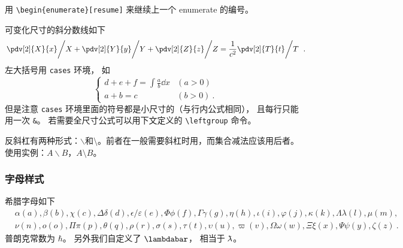 用 \verb|\begin{enumerate}[resume]|  来继续上一个 enumerate 的编号。

可变化尺寸的斜分数线如下
\begin{equation}
\left. \pdv[2]{X}{x} \middle/ X + \pdv[2]{Y}{y} \middle/ Y + \pdv[2]{Z}{z} \middle/ Z  = \frac{1}{c^2}  \pdv[2]{T}{t} \middle/ T\right.~.
\end{equation}
左大括号用 \verb|cases| 环境， 如
\begin{equation}
\begin{cases}
d+e+f = \int \frac{a}{b} \dd{x} &(a > 0)\\
a+b = c &(b > 0)~.
\end{cases}
\end{equation}
但是注意 \verb|cases| 环境里面的符号都是小尺寸的（与行内公式相同）， 且每行只能用一次 \verb|&|。 若需要全尺寸公式可以用下文定义的 \verb|\leftgroup| 命令。

反斜杠有两种形式：$\backslash$和$\setminus$。前者在一般需要斜杠时用，而集合减法应该用后者。使用实例：$A\backslash B$，$A\setminus B$。

\subsubsection{字母样式}
希腊字母如下
\begin{equation}
\begin{aligned}
&\alpha (a), \beta (b), \chi (c), \Delta\delta (d), \epsilon/\varepsilon (e), \Phi\phi (f), \Gamma\gamma (g),
\eta (h), \iota (i), \varphi (j), \kappa (k), \Lambda\lambda (l), \mu (m),\\
& \nu (n), o (o),\Pi\pi (p), \theta (q), \rho (r), \sigma (s), \tau (t), \upsilon (u), \varpi (v), \Omega\omega (w), \Xi\xi (x), \Psi\psi (y), \zeta (z)~.
\end{aligned}
\end{equation}
普朗克常数为 $\hbar$。 另外我们自定义了 $\lambdabar$， 相当于 $\mkern-0.25mu {\bar{\phantom{a}}} \mkern -10.2mu\lambda$。

